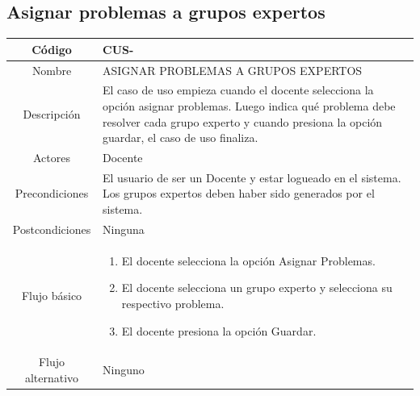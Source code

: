 \subsection{Asignar problemas a grupos expertos}
\begin{longtable}{|c|L{10cm}|}
	\hline
	Código &  CUS-\casodeuso\\  \hline
	Nombre &  ASIGNAR PROBLEMAS A GRUPOS EXPERTOS\\  \hline
	Descripción &  El caso de uso empieza cuando el docente selecciona la opción asignar problemas. Luego indica qué problema debe resolver cada grupo experto y cuando presiona la opción guardar, el caso de uso finaliza.\\  \hline
	Actores &  Docente\\  \hline
	Precondiciones &  El usuario de ser un Docente y estar logueado en el sistema. Los grupos expertos deben haber sido generados por el sistema.\\  \hline
	Postcondiciones &  Ninguna\\  \hline
	Flujo básico &    \begin{enumerate}
		\item El docente selecciona la opción Asignar Problemas.
		\item El docente selecciona un grupo experto y selecciona su respectivo problema.
		\item El docente presiona la opción Guardar.
	\end{enumerate}  \\ \hline
	Flujo alternativo & Ninguno \\  \hline
\end{longtable}
\clearpage
